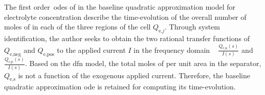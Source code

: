 
The                  first                 order~\glspl{ode}                  of
 in the baseline
quadratic  approximation  model  for   electrolyte  concentration  describe  the
time-evolution of the overall number of moles  of  in each of the three
regions of the cell $Q_{\text{e,}j}$.  Through system identification, the author
seeks  to obtain  the two  rational transfer  functions of  $Q_\text{e,neg}$ and
$Q_\text{e,pos}$  to the  applied current  $I$  in the  frequency domain \ie~
$\frac{Q_\text{e,n}(s)}{I(s)}$ and $\frac{Q_\text{e,p}(s)}{I(s)}$.  Based on the
\gls{dfn} model,  the total moles of   per unit area  in the separator,
$Q_\text{e,s}$ is  not a function  of the exogenous applied  current. Therefore,
the baseline  quadratic approximation  \gls{ode} is  retained for  computing its
time-evolution.

